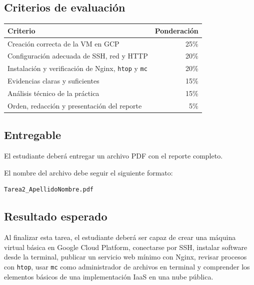\documentclass[
  coursetitle={Cómputo Nube y Tecnologías Emergentes},
  coursehours={96},
  coursedate={Verano 2026},
  doctype={Tarea 2},
  otherlangs={english,french},
  authorname={Lázaro},
  authorsurname={Bustio-Martínez},
  authortitle={PhD},
  role={Profesor Investigador},
  email={lbustio@inaoe.mx},
  phone={5559504000},
  ext={7459},
  institution={Instituto Nacional de Astrofísica, Óptica y Electrónica (INAOE)},
  department={Maestría en Ciencias en Tecnologías de Seguridad},
  address={Luis Enrique Erro 1, Sta. Ma. Tonantzintla, San Andrés Cholula, CP 72840, Puebla, México},
  margin={0.5in}
]{lbustio_lecture_notes}
\begin{document}
\subsection{Criterios de evaluación}
\label{sec:tarea2-criterios}

\begin{center}
\begin{tabular}{|p{}|r|}
\hline
\textbf{Criterio} & \textbf{Ponderación} \\
\hline
Creación correcta de la VM en GCP & 25\% \\
\hline
Configuración adecuada de SSH, red y HTTP & 20\% \\
\hline
Instalación y verificación de Nginx, \texttt{htop} y \texttt{mc} & 20\% \\
\hline
Evidencias claras y suficientes & 15\% \\
\hline
Análisis técnico de la práctica & 15\% \\
\hline
Orden, redacción y presentación del reporte & 5\% \\
\hline
\end{tabular}
\end{center}

\subsection{Entregable}
\label{sec:tarea2-entregable}

El estudiante deberá entregar un archivo PDF con el reporte completo.

El nombre del archivo debe seguir el siguiente formato:

\begin{verbatim}
Tarea2_ApellidoNombre.pdf
\end{verbatim}

\subsection{Resultado esperado}
\label{sec:tarea2-resultado}

Al finalizar esta tarea, el estudiante deberá ser capaz de crear una máquina virtual básica en Google Cloud Platform, conectarse por SSH, instalar software desde la terminal, publicar un servicio web mínimo con Nginx, revisar procesos con \texttt{htop}, usar \texttt{mc} como administrador de archivos en terminal y comprender los elementos básicos de una implementación IaaS en una nube pública.
\end{document}
